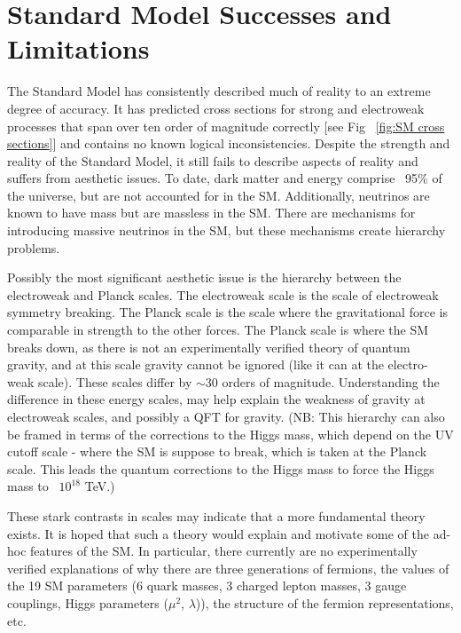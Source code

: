\chapter{Standard Model Successes and Limitations}
The Standard Model has consistently described much of reality to an extreme degree of accuracy. It has predicted cross sections for strong and electroweak processes that span over ten order of magnitude correctly [see Fig ~\ref{fig:SM cross sections}] and contains no known logical inconsistencies. Despite the strength and reality of the Standard Model, it still fails to describe aspects of reality and suffers from aesthetic issues. 
To date, dark matter and energy comprise ~95\% of the universe, but are not accounted for in the SM. Additionally, neutrinos are known to have mass but are massless in the SM. There are mechanisms for introducing massive neutrinos in the SM, but these mechanisms create hierarchy problems. 

Possibly the most significant aesthetic issue is the hierarchy between the electroweak and Planck scales. The electroweak scale is the scale of electroweak symmetry breaking. The Planck scale is the scale where the gravitational force is comparable in strength to the other forces. The Planck scale is where the SM breaks down, as there is not an experimentally verified theory of quantum gravity, and at this scale gravity cannot be ignored (like it can at the electro-weak scale). These scales differ by $\sim30$ orders of magnitude. Understanding the difference in these energy scales, may help explain the weakness of gravity at electroweak scales, and possibly a QFT for gravity. (NB: This hierarchy can also be framed in terms of the corrections to the Higgs mass, which depend on the UV cutoff scale - where the SM is suppose to break, which is taken at the Planck scale. This leads the quantum corrections to the Higgs mass to force the Higgs mass to ~$10^{18}$ TeV.)

These stark contrasts in scales may indicate that a more fundamental theory exists. It is hoped that such a theory would explain and motivate some of the ad-hoc features of the SM. In particular, there currently are no experimentally verified explanations of why there are three generations of fermions, the values of the 19 SM parameters (6 quark masses, 3 charged lepton masses, 3 gauge couplings, Higgs parameters ($\mu^{2}$, $\lambda$)), the structure of the fermion representations, etc. 


